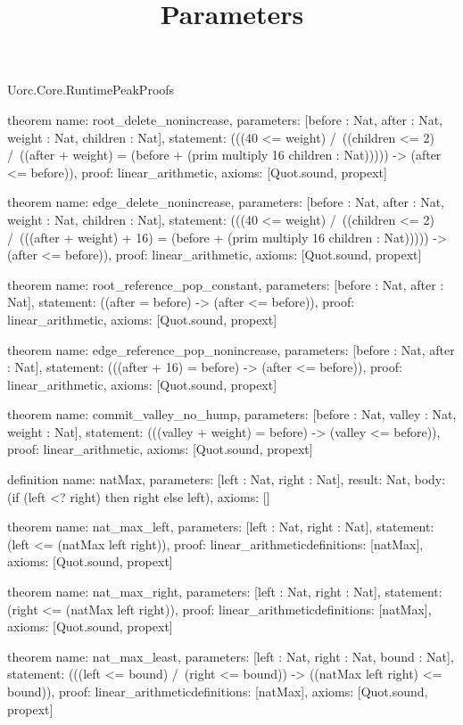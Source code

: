 \begin{lexlean}{Uorc.Core.RuntimePeakProofs}
\title{Parameters}
\begin{semanticmodule}
theorem{
  name: root_delete_nonincrease,
  parameters: [before : Nat, after : Nat, weight : Nat, children : Nat],
  statement: (((40 <= weight) /\ ((children <= 2) /\ ((after + weight) = (before + (prim multiply 16 children : Nat))))) -> (after <= before)),
  proof: linear_arithmetic{},
  axioms: [Quot.sound, propext]
}

theorem{
  name: edge_delete_nonincrease,
  parameters: [before : Nat, after : Nat, weight : Nat, children : Nat],
  statement: (((40 <= weight) /\ ((children <= 2) /\ (((after + weight) + 16) = (before + (prim multiply 16 children : Nat))))) -> (after <= before)),
  proof: linear_arithmetic{},
  axioms: [Quot.sound, propext]
}

theorem{
  name: root_reference_pop_constant,
  parameters: [before : Nat, after : Nat],
  statement: ((after = before) -> (after <= before)),
  proof: linear_arithmetic{},
  axioms: [Quot.sound, propext]
}

theorem{
  name: edge_reference_pop_nonincrease,
  parameters: [before : Nat, after : Nat],
  statement: (((after + 16) = before) -> (after <= before)),
  proof: linear_arithmetic{},
  axioms: [Quot.sound, propext]
}

theorem{
  name: commit_valley_no_hump,
  parameters: [before : Nat, valley : Nat, weight : Nat],
  statement: (((valley + weight) = before) -> (valley <= before)),
  proof: linear_arithmetic{},
  axioms: [Quot.sound, propext]
}

definition{
  name: natMax,
  parameters: [left : Nat, right : Nat],
  result: Nat,
  body: (if (left <? right) then right else left),
  axioms: []
}

theorem{
  name: nat_max_left,
  parameters: [left : Nat, right : Nat],
  statement: (left <= (natMax left right)),
  proof: linear_arithmetic{definitions: [natMax]},
  axioms: [Quot.sound, propext]
}

theorem{
  name: nat_max_right,
  parameters: [left : Nat, right : Nat],
  statement: (right <= (natMax left right)),
  proof: linear_arithmetic{definitions: [natMax]},
  axioms: [Quot.sound, propext]
}

theorem{
  name: nat_max_least,
  parameters: [left : Nat, right : Nat, bound : Nat],
  statement: (((left <= bound) /\ (right <= bound)) -> ((natMax left right) <= bound)),
  proof: linear_arithmetic{definitions: [natMax]},
  axioms: [Quot.sound, propext]
}


\end{semanticmodule}
\end{lexlean}
